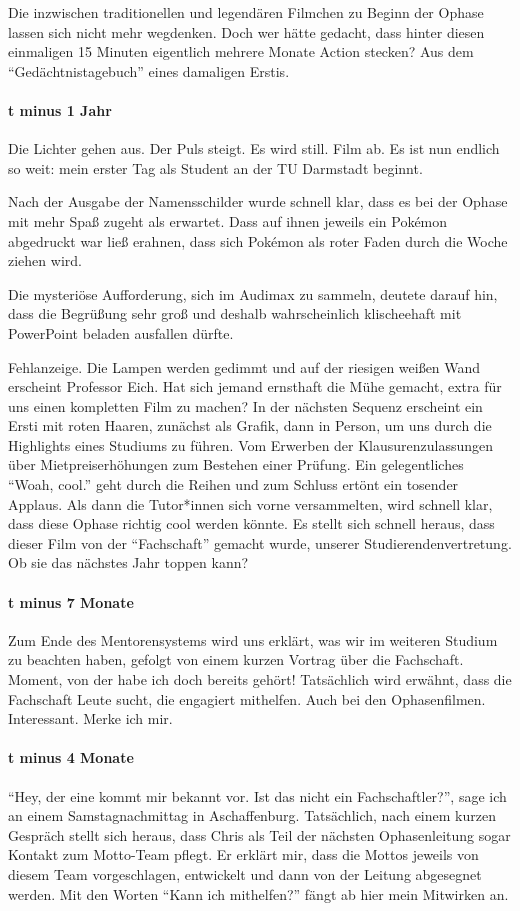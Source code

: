 {Die inzwischen traditionellen und legendären Filmchen zu Beginn der Ophase
lassen sich nicht mehr wegdenken. Doch wer hätte gedacht, dass hinter diesen
einmaligen 15 Minuten eigentlich mehrere Monate Action stecken? Aus dem
\enquote{Gedächtnistagebuch} eines damaligen Erstis.}
{\paragraph{t minus 1 Jahr}
Die Lichter gehen aus. Der Puls steigt. Es wird still. Film ab. Es ist nun
endlich so weit: mein erster Tag als Student an der TU Darmstadt beginnt.

Nach der Ausgabe der Namensschilder wurde schnell klar, dass es bei der Ophase
mit mehr Spaß zugeht als erwartet. Dass auf ihnen jeweils ein Pokémon
abgedruckt war ließ erahnen, dass sich Pokémon als roter Faden durch die Woche
ziehen wird.

Die mysteriöse Aufforderung, sich im Audimax zu sammeln, deutete darauf hin,
dass die Begrüßung sehr groß und deshalb wahrscheinlich klischeehaft mit
PowerPoint beladen ausfallen dürfte.

Fehlanzeige. Die Lampen werden gedimmt und auf der riesigen weißen Wand
erscheint Professor Eich. Hat sich jemand ernsthaft die Mühe gemacht, extra für
uns einen kompletten Film zu machen? In der nächsten Sequenz erscheint ein
Ersti mit roten Haaren, zunächst als Grafik, dann in Person, um uns durch die
Highlights eines Studiums zu führen. Vom Erwerben der Klausurenzulassungen über
Mietpreiserhöhungen zum Bestehen einer Prüfung. Ein gelegentliches \enquote{Woah,
cool.} geht durch die Reihen und zum Schluss ertönt ein tosender Applaus. Als
dann die Tutor*innen sich vorne versammelten, wird schnell klar, dass diese
Ophase richtig cool werden könnte. Es stellt sich schnell heraus, dass dieser
Film von der \enquote{Fachschaft} gemacht wurde, unserer Studierendenvertretung. Ob sie
das nächstes Jahr toppen kann?
\paragraph{t minus 7 Monate}
Zum Ende des Mentorensystems wird uns erklärt, was wir im weiteren Studium zu beachten haben,
gefolgt von einem kurzen Vortrag über die Fachschaft. Moment, von der habe ich
doch bereits gehört!  
Tatsächlich wird erwähnt, dass die Fachschaft Leute sucht, die engagiert
mithelfen. Auch bei den Ophasenfilmen. Interessant. Merke ich mir.
\paragraph{t minus 4 Monate}
\enquote{Hey, der eine kommt mir bekannt vor. Ist das nicht ein Fachschaftler?}, sage
ich an einem Samstagnachmittag in Aschaffenburg. Tatsächlich, nach einem kurzen
Gespräch stellt sich heraus, dass Chris als Teil der nächsten Ophasenleitung
sogar Kontakt zum Motto-Team pflegt. Er erklärt mir, dass die Mottos jeweils
von diesem Team vorgeschlagen, entwickelt und dann von der Leitung abgesegnet
werden. Mit den Worten \enquote{Kann ich mithelfen?} fängt ab hier mein Mitwirken an.

}
